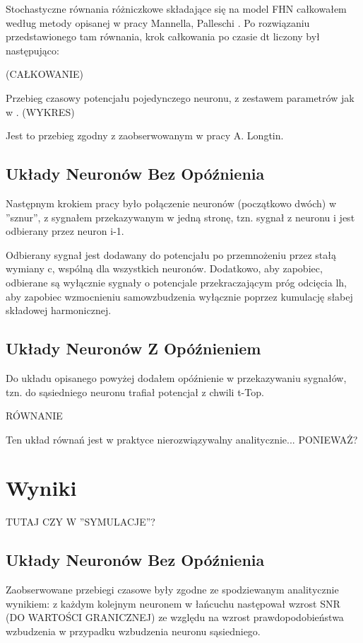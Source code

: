\documentclass[12pt]{article}
\begin{document}
  Stochastyczne równania różniczkowe składające się na model FHN całkowałem według metody opisanej w pracy Mannella, Palleschi \cite{mannella}. Po rozwiązaniu przedstawionego tam równania, krok całkowania po czasie dt liczony był następująco:
  
  (CAŁKOWANIE)
  
  Przebieg czasowy potencjału pojedynczego neuronu, z zestawem parametrów jak w \cite{longtin}.
  (WYKRES)
  
  Jest to przebieg zgodny z zaobserwowanym w pracy A. Longtin.
  
  \subsection{Układy Neuronów Bez Opóźnienia}
  
  Następnym krokiem pracy było połączenie neuronów (początkowo dwóch) w ''sznur'', z sygnałem przekazywanym w jedną stronę, tzn. sygnał z neuronu i jest odbierany przez neuron i-1.
  
  Odbierany sygnał jest dodawany do potencjału po przemnożeniu przez stałą wymiany c, wspólną dla wszystkich neuronów. Dodatkowo, aby zapobiec, odbierane są wyłącznie sygnały o potencjale przekraczającym próg odcięcia lh, aby zapobiec wzmocnieniu samowzbudzenia wyłącznie poprzez kumulację słabej składowej harmonicznej.
  
  \subsection{Układy Neuronów Z Opóźnieniem}
  
  Do układu opisanego powyżej dodałem opóźnienie w przekazywaniu sygnałów, tzn. do sąsiedniego neuronu trafiał potencjał z chwili t-Top.
  
  RÓWNANIE
  
  Ten układ równań jest w praktyce nierozwiązywalny analitycznie... PONIEWAŻ?
  
  \section{Wyniki}
  
  TUTAJ CZY W ''SYMULACJE''?
  
  \subsection{Układy Neuronów Bez Opóźnienia}
  
  Zaobserwowane przebiegi czasowe były zgodne ze spodziewanym analitycznie wynikiem: z każdym kolejnym neuronem w łańcuchu następował wzrost SNR (DO WARTOŚCI GRANICZNEJ) ze względu na wzrost prawdopodobieństwa wzbudzenia w przypadku wzbudzenia neuronu sąsiedniego.
  
  
  \newpage
  
  
  
  
  
\end{document}
